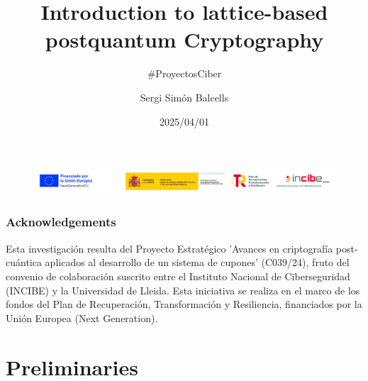 \documentclass[presentation]{beamer}
\author{Sergi Simón Balcells}
\date{2025/04/01}
\title{Introduction to lattice-based postquantum Cryptography}
\subtitle{\#ProyectosCiber}
\newlength\beamerleftmargin
\begin{document}
\begin{frame}
  \titlepage
  \begin{figure}
    \hspace*{-\beamerleftmargin}%
    \includegraphics[width=\paperwidth]{incibe.jpg}
  \end{figure}
\end{frame}

\begin{frame}
  \frametitle{Acknowledgements}
  
Esta investigación resulta del Proyecto Estratégico 'Avances en criptografía post-cuántica aplicados al desarrollo de un sistema de cupones' (C039/24), fruto del convenio de colaboración suscrito entre el Instituto Nacional de Ciberseguridad (INCIBE) y la Universidad de Lleida. Esta iniciativa se realiza en el marco de los fondos del Plan de Recuperación, Transformación y Resiliencia, financiados por la Unión Europea (Next Generation).
\end{frame}


\section{Preliminaries}
\end{document}
